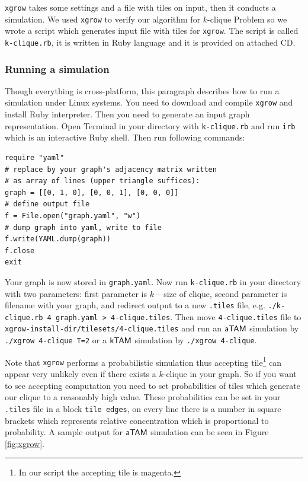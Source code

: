 {\tt xgrow} takes some settings and a file with tiles on input, then it conducts a simulation. We used {\tt xgrow} to verify our algorithm for $k$-clique Problem so we wrote a script which generates input file with tiles for {\tt xgrow}. The script is called {\tt k-clique.rb}, it is written in Ruby language and it is provided on attached CD.

\subsubsection*{Running a simulation}

Though everything is cross-platform, this paragraph describes how to run a simulation under Linux systems. You need to download and compile {\tt xgrow} and install Ruby interpreter. Then you need to generate an input graph representation. Open Terminal in your directory with {\tt k-clique.rb} and run {\tt irb} which is an interactive Ruby shell. Then run following commands:
\begin{verbatim}
require "yaml"
# replace by your graph's adjacency matrix written
# as array of lines (upper triangle suffices):
graph = [[0, 1, 0], [0, 0, 1], [0, 0, 0]]
# define output file
f = File.open("graph.yaml", "w")
# dump graph into yaml, write to file
f.write(YAML.dump(graph))
f.close
exit
\end{verbatim}
Your graph is now stored in {\tt graph.yaml}. Now run {\tt k-clique.rb} in your directory with two parameters: first parameter is $k$ -- size of clique, second parameter is filename with your graph, and redirect output to a new {\tt *.tiles} file, e.g. {\tt ./k-clique.rb 4 graph.yaml > 4-clique.tiles}. Then move {\tt 4-clique.tiles} file to {\tt xgrow-install-dir/tilesets/4-clique.tiles} and run an $\mathsf{aTAM}$ simulation by {\tt ./xgrow 4-clique T=2} or a $\mathsf{kTAM}$ simulation by {\tt ./xgrow 4-clique}.

Note that {\tt xgrow} performs a probabilistic simulation thus accepting tile\footnote{In our script the accepting tile is magenta.} can appear very unlikely even if there exists a $k$-clique in your graph. So if you want to see accepting computation you need to set probabilities of tiles which generate our clique to a reasonably high value. These probabilities can be set in your {\tt *.tiles} file in a block {\tt tile edges}, on every line there is a number in square brackets which represents relative concentration which is proportional to probability. A sample output for $\mathsf{aTAM}$ simulation can be seen in Figure \ref{fig:xgrow}.

